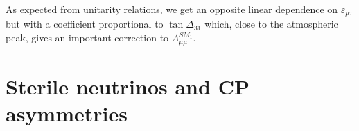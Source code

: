 \documentclass[12pt]{article}
\begin{document}
As expected from unitarity relations, we get an opposite linear dependence on $\varepsilon_{\mu\tau}$ but with a coefficient proportional to $\tan{\Delta_{31}}$ which, close to the atmospheric peak, gives an important correction to $A_{\mu \mu}^{SM_1}$. 


\section{Sterile neutrinos and CP asymmetries}\label{CPasysterile}
\end{document}
